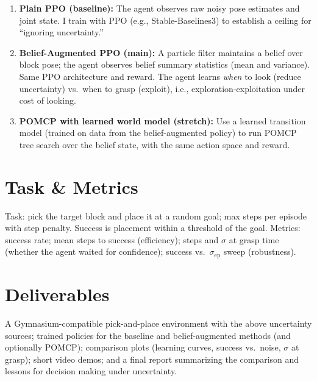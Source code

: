 \documentclass{article}
\begin{document}
\begin{enumerate}
  \item \textbf{Plain PPO (baseline):} The agent observes raw noisy pose estimates and joint state. I train with PPO (e.g., Stable-Baselines3) to establish a ceiling for ``ignoring uncertainty.''
  \item \textbf{Belief-Augmented PPO (main):} A particle filter maintains a belief over block pose; the agent observes belief summary statistics (mean and variance). Same PPO architecture and reward. The agent learns \emph{when} to look (reduce uncertainty) vs.\ when to grasp (exploit), i.e., exploration-exploitation under cost of looking.
  \item \textbf{POMCP with learned world model (stretch):} Use a learned transition model (trained on data from the belief-augmented policy) to run POMCP tree search over the belief state, with the same action space and reward.
\end{enumerate}

\section{Task \& Metrics}

Task: pick the target block and place it at a random goal; max steps per episode with step penalty. Success is placement within a threshold of the goal. Metrics: success rate; mean steps to success (efficiency); steps and $\sigma$ at grasp time (whether the agent waited for confidence); success vs.\ $\sigma_{\text{ep}}$ sweep (robustness).

\section{Deliverables}

A Gymnasium-compatible pick-and-place environment with the above uncertainty sources; trained policies for the baseline and belief-augmented methods (and optionally POMCP); comparison plots (learning curves, success vs.\ noise, $\sigma$ at grasp); short video demos; and a final report summarizing the comparison and lessons for decision making under uncertainty.
\end{document}
